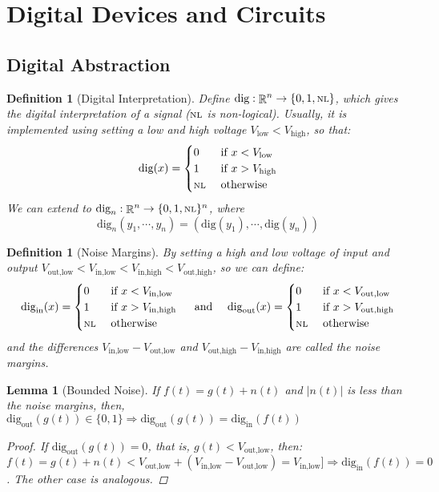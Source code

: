 \documentclass[12pt]{article}
\newcommand{\scr}[1]{{\scriptstyle\textup{#1}}}
\DeclareMathOperator{\R}{\mathbb{R}}
\newcommand*{\B}{\{0,1\}}
\newtheorem{definition}[theorem]{Definition}
\newtheorem{lemma}[theorem]{Lemma}
\begin{document}
\pagebreak

\section{Digital Devices and Circuits}

\subsection{Digital Abstraction}

\begin{definition}[Digital Interpretation]
  Define $\text{dig}:\R^n\to\{0,1,\scr{NL}\}$, which gives the digital interpretation of a signal ($\scr{NL}$ is non-logical). Usually, it is implemented using setting a low and high voltage $V_\text{low}<V_\text{high}$, so that: $$\text{dig}(x)=\begin{cases}
    0&\text{ if }x<V_\text{low}\\
    1&\text{ if }x>V_\text{high}\\
    \scr{NL}&\text{ otherwise}
  \end{cases}$$
  We can extend to $\text{dig}_n:\R^n\to\{0,1,\scr{NL}\}^n$, where $$\text{dig}_n(y_1,\cdots,y_n)=(\text{dig}(y_1),\cdots,\text{dig}(y_n))$$
\end{definition}

\begin{definition}[Noise Margins]
  By setting a high and low voltage of input and output $V_\text{out,low}<V_\text{in,low}<V_\text{in,high}<V_\text{out,high}$, so we can define: 
  $$\text{dig}_\text{in}(x)=\begin{cases}
    0&\text{ if }x<V_\text{in,low}\\
    1&\text{ if }x>V_\text{in,high}\\
    \scr{NL}&\text{ otherwise}
  \end{cases}\quad\text{ and }\quad\text{dig}_\text{out}(x)=\begin{cases}
    0&\text{ if }x<V_\text{out,low}\\
    1&\text{ if }x>V_\text{out,high}\\
    \scr{NL}&\text{ otherwise}
  \end{cases}$$ and the differences $V_\text{in,low}-V_\text{out,low}$ and $V_\text{out,high}-V_\text{in,high}$ are called the noise margins.
\end{definition}

\begin{lemma}[Bounded Noise]
  If $f(t)=g(t)+n(t)$ and $|n(t)|$ is less than  the noise margins, then, $\text{dig}_\text{out}(g(t))\in\B\Rightarrow \text{dig}_\text{out}(g(t))=\text{dig}_\text{in}(f(t))$
  \begin{proof}
    If $\text{dig}_\text{out}(g(t))=0$, that is, $g(t)<V_\text{out,low}$, then: $f(t)=g(t)+n(t)<V_\text{out,low}+(V_\text{in,low}-V_\text{out,low})=V_\text{in,low}]\Rightarrow \text{dig}_\text{in}(f(t))=0$. The other case is analogous.
  \end{proof}
\end{lemma}
\end{document}
